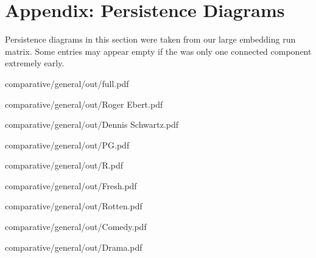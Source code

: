 \documentclass[fleqn,10pt]{SelfArx}
\begin{document}




\clearpage
\appendix
\section*{Appendix: Persistence Diagrams}
Persistence diagrams in this section were taken from our large embedding run matrix. Some entries may appear empty if the was only one connected component extremely early.


  {comparative/general/out/full.pdf}

  {comparative/general/out/Roger Ebert.pdf}


    {comparative/general/out/Dennis Schwartz.pdf}


  {comparative/general/out/PG.pdf}


  {comparative/general/out/R.pdf}


  {comparative/general/out/Fresh.pdf}


  {comparative/general/out/Rotten.pdf}


  {comparative/general/out/Comedy.pdf}


  {comparative/general/out/Drama.pdf}
  
\end{document}
